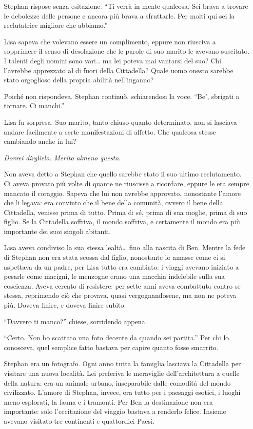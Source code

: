 Stephan rispose senza esitazione. ``Ti verrà in mente qualcosa. Sei brava a trovare le debolezze
delle persone e ancora più brava a sfruttarle. Per molti qui sei la reclutatrice migliore che
abbiamo.''

Lisa sapeva che volevano essere un complimento, eppure non riusciva a sopprimere il senso di
desolazione che le parole di suo marito le avevano suscitato. I talenti degli uomini sono
vari\dots{} ma lei poteva mai vantarsi del suo? Chi l'avrebbe apprezzato al di fuori della
Cittadella? Quale uomo onesto sarebbe stato orgoglioso della propria abilità nell'inganno?

Poiché non rispondeva, Stephan continuò, schiarendosi la voce. ``Be', sbrigati a tornare. Ci
manchi.''

Lisa fu sorpresa. Suo marito, tanto chiuso quanto determinato, non si lasciava andare facilmente a
certe manifestazioni di affetto. Che qualcosa stesse cambiando anche in lui?

\emph{Dovrei dirglielo. Merita almeno questo.}

Non aveva detto a Stephan che quello sarebbe stato il suo ultimo reclutamento. Ci aveva provato più
volte di quante ne riuscisse a ricordare, eppure le era sempre mancato il coraggio. Sapeva che lui
non avrebbe approvato, nonostante l'amore che li legava: era convinto che il bene della comunità,
ovvero il bene della Cittadella, venisse prima di tutto. Prima di sé, prima di sua moglie, prima di
suo figlio. Se la Cittadella soffriva, il mondo soffriva, e certamente il mondo era più importante
dei suoi singoli abitanti.

Lisa aveva condiviso la sua stessa lealtà\dots{} fino alla nascita di Ben. Mentre la fede di Stephan
non era stata scossa dal figlio, nonostante lo amasse come ci si aspettava da un padre, per Lisa
tutto era cambiato: i viaggi avevano iniziato a pesarle come macigni, le menzogne erano una macchia
indelebile sulla sua coscienza. Aveva cercato di resistere: per sette anni aveva combattuto contro
se stessa, reprimendo ciò che provava, quasi vergognandosene, ma non ne poteva più. Doveva finire, e
doveva finire subito.

``Davvero ti manco?'' chiese, sorridendo appena.

``Certo. Non ho scattato una foto decente da quando sei partita.'' Per chi lo conosceva, quel
semplice fatto bastava per capire quanto fosse smarrito.

Stephan era un fotografo. Ogni anno tutta la famiglia lasciava la Cittadella per visitare una nuova
località. Lei preferiva le meraviglie dell'architettura a quelle della natura: era un animale
urbano, inseparabile dalle comodità del mondo civilizzato. L'amore di Stephan, invece, era tutto per
i paesaggi esotici, i luoghi meno esplorati, la fauna e i tramonti. Per Ben la destinazione non era
importante: solo l'eccitazione del viaggio bastava a renderlo felice. Insieme avevano visitato tre
continenti e quattordici Paesi.

